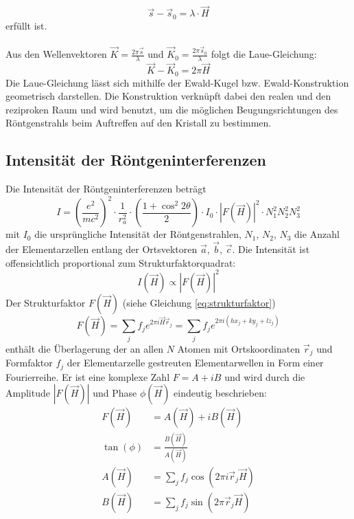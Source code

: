 \documentclass[a4paper,titlepage]{scrartcl}
\numberwithin{equation}{section}
\begin{document}
\begin{equation*}
\vec{s}-\vec{s}_0=\lambda \cdot \vec{H}
\end{equation*}
erfüllt ist.\\ \\
Aus den Wellenvektoren $\vec{K}=\frac{2 \pi \vec{s}}{\lambda}$ und $\vec{K}_0=\frac{2 \pi \vec{s}_0}{\lambda}$ folgt die Laue-Gleichung:
\begin{equation*}
\vec{K}-\vec{K}_0=2 \pi \vec{H}
\end{equation*}
Die Laue-Gleichung lässt sich mithilfe der Ewald-Kugel bzw. Ewald-Konstruktion geometrisch darstellen. Die Konstruktion verknüpft dabei den realen und den reziproken Raum und wird benutzt, um die möglichen Beugungsrichtungen des Röntgenstrahls beim Auftreffen auf den Kristall zu bestimmen.
\subsection{Intensität der Röntgeninterferenzen \cite{roentgenbeugung} \cite{roentgeninterferenzen} \cite{wiki:ausloeschung}}
Die Intensität der Röntgeninterferenzen beträgt
\begin{equation}
\label{eq:intensitaetpunkt}
I=\left( \frac{e^2}{mc^2} \right)^2 \cdot \frac{1}{r_a^2} \cdot \left( \frac{1 + \cos^2{2 \theta}}{2} \right) \cdot I_0 \cdot |F(\vec{H})|^2 \cdot N_1^2 N_2^2 N_3^2
\end{equation}
mit $I_0$ die ursprüngliche Intensität der Röntgenstrahlen, $N_1$, $N_2$, $N_3$ die Anzahl der Elementarzellen entlang der Ortsvektoren $\vec{a}$, $\vec{b}$, $\vec{c}$. Die Intensität ist offensichtlich proportional zum Strukturfaktorquadrat:
\begin{equation*}
I (\vec{H}) \propto |F(\vec{H})|^2
\end{equation*}
Der Strukturfaktor $F(\vec{H})$ (siehe Gleichung \ref{eq:strukturfaktor})
\begin{equation}
\label{eq:strukturfaktor}
F(\vec{H})=\sum_j f_j e^{2 \pi i \vec{H} \vec{r}_j}=\sum_j f_j e^{2 \pi i (h x_j + k y_j + l z_j)}
\end{equation}
enthält die Überlagerung der an allen $N$ Atomen mit Ortskoordinaten $\vec{r}_j$ und Formfaktor $f_j$ der Elementarzelle gestreuten Elementarwellen in Form einer Fourierreihe. Er ist eine komplexe Zahl $F=A+iB$ und wird durch die Amplitude $|F(\vec{H})|$ und Phase $\phi(\vec{H})$ eindeutig beschrieben:
\begin{align*}
F(\vec{H})&=A(\vec{H})+iB(\vec{H})\\
\tan{(\phi)}&=\frac{B(\vec{H})}{A(\vec{H})}\\
A(\vec{H})&=\sum_j f_j \cos{(2 \pi i \vec{r}_j \vec{H})}\\
B(\vec{H})&=\sum_j f_j \sin{(2 \pi \vec{r}_j \vec{H})}
\end{align*}
\end{document}
